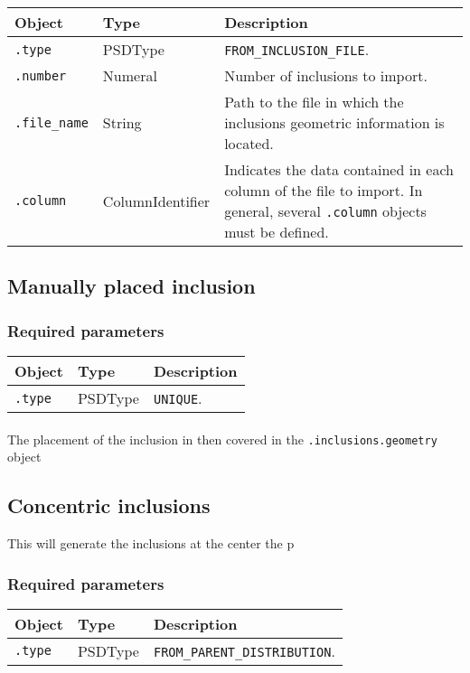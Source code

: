 \documentclass[10pt]{article}
\begin{document}
\begin{tabularx}{\textwidth}{llX}
\hline 
Object & Type & Description \\ 
\hline 
\verb+.type+ & PSDType & \verb+FROM_INCLUSION_FILE+. \\ 
\verb+.number+ & Numeral & Number of inclusions to import. \\ 
\verb+.file_name+ & String & Path to the file in which the inclusions geometric information is located.\\ 
\verb+.column+ & ColumnIdentifier & Indicates the data contained in each column of the file to import. In general, several \verb+.column+ objects must be defined. \\ 
\hline 
\end{tabularx}

\subsection{Manually placed inclusion}

\subsubsection*{Required parameters}

\begin{tabularx}{\textwidth}{llX}
\hline 
Object & Type & Description \\ 
\hline 
\verb+.type+ & PSDType & \verb+UNIQUE+. \\ 
\hline 
\end{tabularx}

\paragraph{} The placement of the inclusion in then covered in the \verb+.inclusions.geometry+ object

\subsection{Concentric inclusions}

This will generate the inclusions at the center the p%

\subsubsection*{Required parameters}

\begin{tabularx}{\textwidth}{llX}
\hline 
Object & Type & Description \\ 
\hline 
\verb+.type+ & PSDType & \verb+FROM_PARENT_DISTRIBUTION+. \\ 
\hline 
\end{tabularx}
\end{document}
